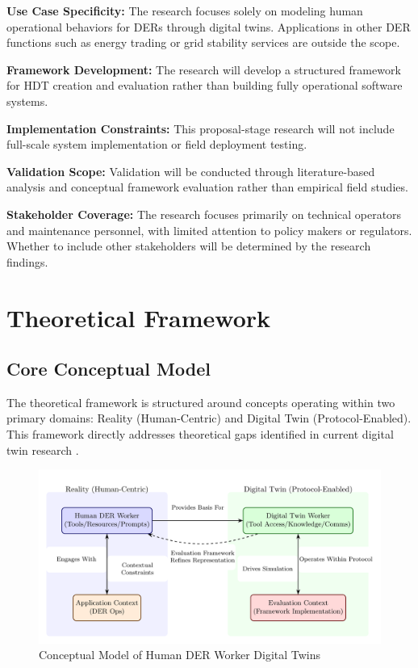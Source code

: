 \documentclass[12pt,a4paper]{article}
\begin{document}
\textbf{Use Case Specificity:} The research focuses solely on modeling human operational behaviors for DERs through digital twins. Applications in other DER functions such as energy trading or grid stability services are outside the scope.

\textbf{Framework Development:} The research will develop a structured framework for HDT creation and evaluation rather than building fully operational software systems.

\textbf{Implementation Constraints:} This proposal-stage research will not include full-scale system implementation or field deployment testing.

\textbf{Validation Scope:} Validation will be conducted through literature-based analysis and conceptual framework evaluation rather than empirical field studies.

\textbf{Stakeholder Coverage:} The research focuses primarily on technical operators and maintenance personnel, with limited attention to policy makers or regulators. Whether to include other stakeholders will be determined by the research findings.

\section{Theoretical Framework}
\label{sec:framework}

\subsection{Core Conceptual Model}

The theoretical framework is structured around concepts operating within two primary domains: Reality (Human-Centric) and Digital Twin (Protocol-Enabled). This framework directly addresses theoretical gaps identified in current digital twin research \cite{10.1186/s10033-024-00998-7} \cite{10.1016/j.ifacol.2022.09.675}.

\begin{figure}[h!]
    \centering
    \includegraphics[width=\linewidth]{conceptual-model-diagram-1.png}
    \caption{Conceptual Model of Human DER Worker Digital Twins}
    \label{fig:conceptual-model}
\end{figure}
\end{document}
